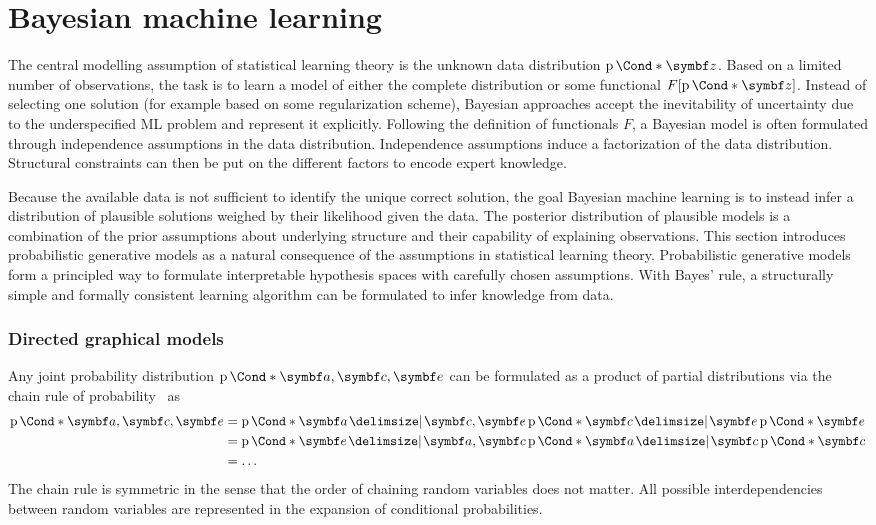\section{Bayesian machine learning}
The central modelling assumption of statistical learning theory is the unknown data distribution $\Prob*{\mat{z}}$.
Based on a limited number of observations, the task is to learn a model of either the complete distribution or some functional $F[\Prob*{\mat{z}}]$.
Instead of selecting one solution (for example based on some regularization scheme), Bayesian approaches accept the inevitability of uncertainty due to the underspecified ML problem and represent it explicitly.
Following the definition of functionals $F$, a Bayesian model is often formulated through independence assumptions in the data distribution.
Independence assumptions induce a factorization of the data distribution.
Structural constraints can then be put on the different factors to encode expert knowledge.

Because the available data is not sufficient to identify the unique correct solution, the goal Bayesian machine learning is to instead infer a distribution of plausible solutions weighed by their likelihood given the data.
The posterior distribution of plausible models is a combination of the prior assumptions about underlying structure and their capability of explaining observations.
This section introduces probabilistic generative models as a natural consequence of the assumptions in statistical learning theory.
Probabilistic generative models form a principled way to formulate interpretable hypothesis spaces with carefully chosen assumptions.
With Bayes' rule, a structurally simple and formally consistent learning algorithm can be formulated to infer knowledge from data.

\subsubsection{Directed graphical models}
Any joint probability distribution $\Prob*{\mat{a}, \mat{c}, \mat{e}}$ can be formulated as a product of partial distributions via the chain rule of probability~\parencite{murphy_machine_2012} as
\begin{align}
    \begin{split}
        \Prob*{\mat{a}, \mat{c}, \mat{e}}
        &= \Prob*{\mat{a} \given \mat{c}, \mat{e}}\Prob*{\mat{c} \given \mat{e}}\Prob*{\mat{e}} \\
        &= \Prob*{\mat{e} \given \mat{a}, \mat{c}}\Prob*{\mat{a} \given \mat{c}}\Prob*{\mat{c}} \\
        &= \dots
    \end{split}
\end{align}
The chain rule is symmetric in the sense that the order of chaining random variables does not matter.
All possible interdependencies between random variables are represented in the expansion of conditional probabilities.

